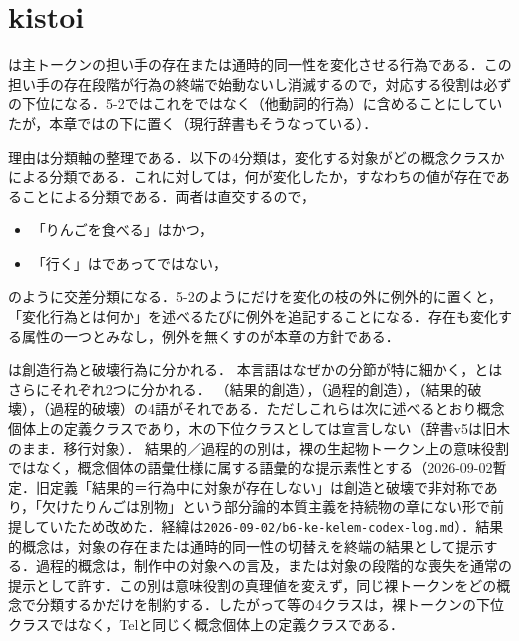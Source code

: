 \documentclass[../../main-detail.tex]{subfiles}
\begin{document}
\section{kistoi}\label{kistoi-sec}
は主トークンの担い手の存在または通時的同一性を変化させる行為である．この担い手の存在段階が行為の終端で始動ないし消滅するので，対応する役割は必ずの下位になる．5-2ではこれをではなく（他動詞的行為）に含めることにしていたが，本章ではの下に置く（現行辞書もそうなっている）．

理由は分類軸の整理である．以下の4分類は，変化する対象がどの概念クラスかによる分類である．これに対しては，何が変化したか，すなわちの値が存在であることによる分類である．両者は直交するので，
\begin{itemize}
    \item 「りんごを食べる」はかつ，
    \item 「行く」はであってではない，
\end{itemize}
のように交差分類になる．5-2のようにだけを変化の枝の外に例外的に置くと，「変化行為とは何か」を述べるたびに例外を追記することになる．存在も変化する属性の一つとみなし，例外を無くすのが本章の方針である．

は創造行為と破壊行為に分かれる．
本言語はなぜかの分節が特に細かく，とはさらにそれぞれ2つに分かれる．
（結果的創造），（過程的創造），（結果的破壊），（過程的破壊）の4語がそれである．ただしこれらは次に述べるとおり概念個体上の定義クラスであり，木の下位クラスとしては宣言しない（辞書v5は旧木のまま．移行対象）．
結果的／過程的の別は，裸の生起物トークン上の意味役割ではなく，概念個体の語彙仕様に属する語彙的な提示素性とする（2026-09-02暫定．旧定義「結果的＝行為中に対象が存在しない」は創造と破壊で非対称であり，「欠けたりんごは別物」という部分論的本質主義を持続物の章にない形で前提していたため改めた．経緯は\texttt{2026-09-02/b6-ke-kelem-codex-log.md}）．結果的概念は，対象の存在または通時的同一性の切替えを終端の結果として提示する．過程的概念は，制作中の対象への言及，または対象の段階的な喪失を通常の提示として許す．この別は意味役割の真理値を変えず，同じ裸トークンをどの概念で分類するかだけを制約する．したがって等の4クラスは，裸トークンの下位クラスではなく，Telと同じく概念個体上の定義クラスである．
\end{document}
